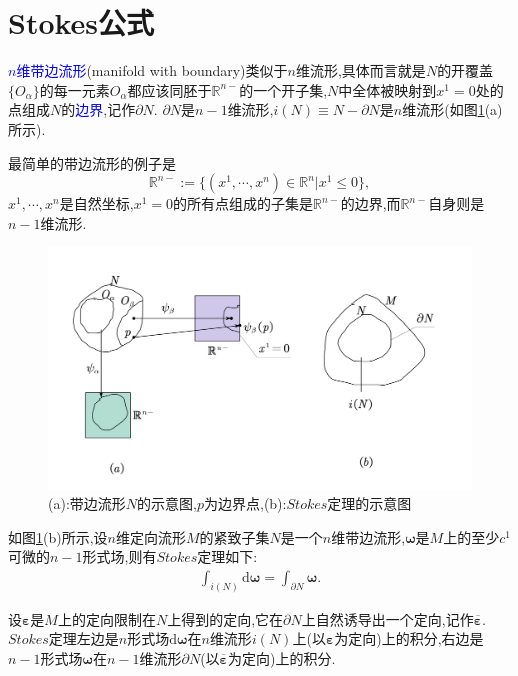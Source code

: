 \section{Stokes公式}

\textcolor{blue}{$n$维带边流形}(manifold with boundary)类似于$n$维流形,具体而言就是$N$的开覆盖$\{O_\alpha\}$的每一元素$O_\alpha$都应该同胚于$\mathbb{R}^{n-}$的一个开子集,$N$中全体被映射到$x^1=0$处的点组成$N$的\textcolor{blue}{边界},记作$\partial N$. $\partial N$是$n-1$维流形,$i(N)\equiv N-\partial N$是$n$维流形(如图\ref{fig:5-3}(a)所示).
\begin{remark}
    最简单的带边流形的例子是$$\mathbb{R}^{n-}:=\{(x^1,\cdots,x^n)\in \mathbb{R}^n|x^1\leqslant 0\},$$
    $x^1,\cdots,x^n$是自然坐标,$x^1=0$的所有点组成的子集是$\mathbb{R}^{n-}$的边界,而$\mathbb{R}^{n-}$自身则是$n-1$维流形.
\end{remark}
\begin{figure}[htbp]
    \centering
 \includegraphics[width=\textwidth]{Pictures/5-3.png}
    \caption{(a):带边流形$N$的示意图,$p$为边界点,(b):$Stokes$定理的示意图}
    \label{fig:5-3}
\end{figure}
如图\ref{fig:5-3}(b)所示,设$n$维定向流形$M$的紧致子集$N$是一个$n$维带边流形,$\boldsymbol{\omega}$是$M$上的至少$c^1$可微的$n-1$形式场,则有$Stokes$定理如下:
\begin{align}
\boxed{\int_{i(N)}\mathrm{d}\boldsymbol{\omega}=\int_{\partial N}\boldsymbol{\omega}.}
\end{align}
\begin{remark}
    设$\boldsymbol{\varepsilon}$是$M$上的定向限制在$N$上得到的定向,它在$\partial N$上自然诱导出一个定向,记作$\overline{\boldsymbol{\varepsilon}}$.
    $Stokes$定理左边是$n$形式场$\mathrm{d}\boldsymbol{\omega}$在$n$维流形$i(N)$上(以$\boldsymbol{\varepsilon}$为定向)上的积分,右边是$n-1$形式场$\boldsymbol{\omega}$在$n-1$维流形$\partial N$(以$\overline{\boldsymbol{\varepsilon}}$为定向)上的积分.
\end{remark}
